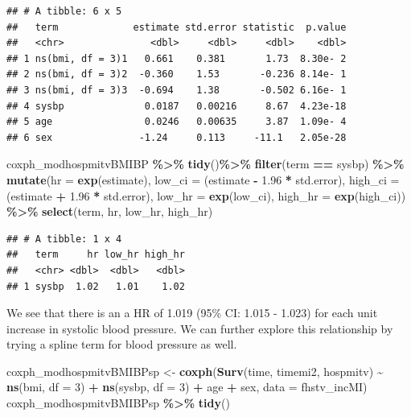 \documentclass[
]{book}
\newenvironment{Shaded}{\begin{snugshade}}{\end{snugshade}}
\newcommand{\AttributeTok}[1]{\textcolor[rgb]{0.13,0.29,0.53}{#1}}
\newcommand{\DecValTok}[1]{\textcolor[rgb]{0.00,0.00,0.81}{#1}}
\newcommand{\FloatTok}[1]{\textcolor[rgb]{0.00,0.00,0.81}{#1}}
\newcommand{\FunctionTok}[1]{\textcolor[rgb]{0.13,0.29,0.53}{\textbf{#1}}}
\newcommand{\NormalTok}[1]{#1}
\newcommand{\OtherTok}[1]{\textcolor[rgb]{0.56,0.35,0.01}{#1}}
\newcommand{\SpecialCharTok}[1]{\textcolor[rgb]{0.81,0.36,0.00}{\textbf{#1}}}
\newcommand{\StringTok}[1]{\textcolor[rgb]{0.31,0.60,0.02}{#1}}
\begin{document}
\begin{verbatim}
## # A tibble: 6 x 5
##   term             estimate std.error statistic  p.value
##   <chr>               <dbl>     <dbl>     <dbl>    <dbl>
## 1 ns(bmi, df = 3)1   0.661    0.381       1.73  8.30e- 2
## 2 ns(bmi, df = 3)2  -0.360    1.53       -0.236 8.14e- 1
## 3 ns(bmi, df = 3)3  -0.694    1.38       -0.502 6.16e- 1
## 4 sysbp              0.0187   0.00216     8.67  4.23e-18
## 5 age                0.0246   0.00635     3.87  1.09e- 4
## 6 sex               -1.24     0.113     -11.1   2.05e-28
\end{verbatim}

\begin{Shaded}
\begin{Highlighting}[]
\NormalTok{coxph\_modhospmitvBMIBP }\SpecialCharTok{\%\textgreater{}\%}
    \FunctionTok{tidy}\NormalTok{()}\SpecialCharTok{\%\textgreater{}\%} 
  \FunctionTok{filter}\NormalTok{(term }\SpecialCharTok{==} \StringTok{\textquotesingle{}sysbp\textquotesingle{}}\NormalTok{) }\SpecialCharTok{\%\textgreater{}\%}
  \FunctionTok{mutate}\NormalTok{(}\AttributeTok{hr =} \FunctionTok{exp}\NormalTok{(estimate),}
         \AttributeTok{low\_ci =}\NormalTok{ (estimate }\SpecialCharTok{{-}} \FloatTok{1.96} \SpecialCharTok{*}\NormalTok{ std.error), }
         \AttributeTok{high\_ci =}\NormalTok{ (estimate }\SpecialCharTok{+} \FloatTok{1.96} \SpecialCharTok{*}\NormalTok{ std.error), }
         \AttributeTok{low\_hr =} \FunctionTok{exp}\NormalTok{(low\_ci), }
         \AttributeTok{high\_hr =} \FunctionTok{exp}\NormalTok{(high\_ci)) }\SpecialCharTok{\%\textgreater{}\%} 
  \FunctionTok{select}\NormalTok{(term, hr, low\_hr, high\_hr)}
\end{Highlighting}
\end{Shaded}

\begin{verbatim}
## # A tibble: 1 x 4
##   term     hr low_hr high_hr
##   <chr> <dbl>  <dbl>   <dbl>
## 1 sysbp  1.02   1.01    1.02
\end{verbatim}

We see that there is an a HR of 1.019 (95\% CI: 1.015 - 1.023) for each unit increase in systolic blood pressure. We can further explore this relationship by trying a spline term for blood pressure as well.

\begin{Shaded}
\begin{Highlighting}[]
\NormalTok{coxph\_modhospmitvBMIBPsp }\OtherTok{\textless{}{-}} \FunctionTok{coxph}\NormalTok{(}\FunctionTok{Surv}\NormalTok{(time, timemi2, hospmitv) }\SpecialCharTok{\textasciitilde{}} 
                                    \FunctionTok{ns}\NormalTok{(bmi, }\AttributeTok{df =} \DecValTok{3}\NormalTok{) }\SpecialCharTok{+} \FunctionTok{ns}\NormalTok{(sysbp, }\AttributeTok{df =} \DecValTok{3}\NormalTok{) }\SpecialCharTok{+}\NormalTok{ age }\SpecialCharTok{+}\NormalTok{ sex, }
                                  \AttributeTok{data =}\NormalTok{ fhstv\_incMI)}
\NormalTok{coxph\_modhospmitvBMIBPsp }\SpecialCharTok{\%\textgreater{}\%}
  \FunctionTok{tidy}\NormalTok{()}
\end{Highlighting}
\end{Shaded}
\end{document}
